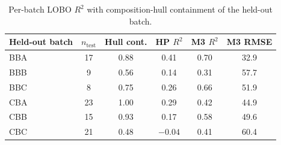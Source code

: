 \documentclass[11pt]{article}
\begin{document}
\begin{table}[htb]
\centering
\caption{Per-batch LOBO $R^2$ with composition-hull containment of the held-out batch.}
\label{tab:perbatch}
\small
\begin{tabular}{lccccc}
\toprule
Held-out batch & $n_\text{test}$ & Hull cont. & HP $R^2$ & M3 $R^2$ & M3 RMSE \\
\midrule
BBA & 17 & 0.88 & 0.41 & 0.70 & 32.9 \\
BBB & 9  & 0.56 & 0.14 & 0.31 & 57.7 \\
BBC & 8  & 0.75 & 0.26 & 0.66 & 51.9 \\
CBA & 23 & 1.00 & 0.29 & 0.42 & 44.9 \\
CBB & 15 & 0.93 & 0.17 & 0.58 & 49.6 \\
CBC & 21 & 0.48 & $-0.04$ & 0.41 & 60.4 \\
\bottomrule
\end{tabular}
\end{table}



\end{document}
